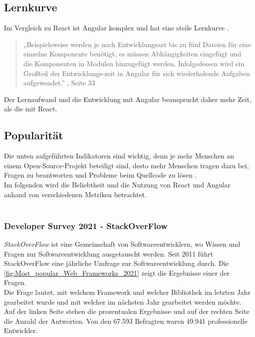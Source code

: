 \subsection{Lernkurve}
Im Vergleich zu React ist Angular komplex und hat eine steile Lernkurve {\cite{E01}}.
\begin{quote}
  „Beispielsweise werden je nach Entwicklungsart bis zu fünf Dateien für eine einzelne Komponente benötigt, es müssen Abhängigkeiten eingefügt und die Komponenten in Modulen hinzugefügt werden. Infolgedessen wird ein Großteil der Entwicklungs-zeit in Angular für sich wiederholende Aufgaben aufgewendet.”
  {, Seite 33\cite{AN1}}
\end{quote}
Der Lernaufwand und die Entwicklung mit Angular beansprucht daher mehr Zeit, als die mit React.

\subsection{Popularität}
Die unten aufgeführten Indikatoren sind wichtig, denn je mehr Menschen an einem Open-Source-Projekt beteiligt sind, desto mehr Menschen tragen dazu bei, Fragen zu beantworten und Probleme beim Quellcode zu lösen {\cite{LIN1}}.
\\
Im folgenden wird die Beliebtheit und die Nutzung von React und Angular anhand von verschiedenen Metriken betrachtet.
\\\\
\subsubsection*{Developer Survey 2021 - StackOverFlow}
\textit{StackOverFlow} ist eine Gemeinschaft von Softwareentwicklern, wo Wissen und Fragen zur Softwareentwicklung ausgetauscht werden. Seit 2011 führt StackOverFlow eine jährliche Umfrage zur Softwareentwicklung durch.
Die \autoref{fig:Most_popular_Web_Frameworks_2021} zeigt die Ergebnisse einer der Fragen. \\
Die Frage lautet, mit welchem Framework und welcher Bibliothek im letzten Jahr gearbeitet wurde und mit welcher im nächsten Jahr gearbeitet werden möchte. Auf der linken Seite stehen die prozentualen Ergebnisse und auf der rechten Seite die Anzahl der Antworten. Von den 67.593 Befragten waren 49.941 professionelle Entwickler. 
  
